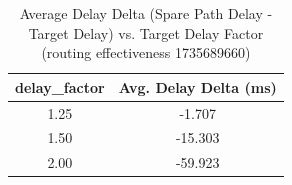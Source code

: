 \begin{table}[htbp]
\centering
\caption{Average Delay Delta (Spare Path Delay - Target Delay) vs. Target Delay Factor (routing effectiveness 1735689660)}
\label{tab:avg_delay_delta_routing_effectiveness_1735689660}
\begin{tabular}{cc}
\toprule
delay_factor & Avg. Delay Delta (ms) \\
\midrule
1.25 & -1.707 \\
1.50 & -15.303 \\
2.00 & -59.923 \\
\bottomrule
\end{tabular}
\end{table}
